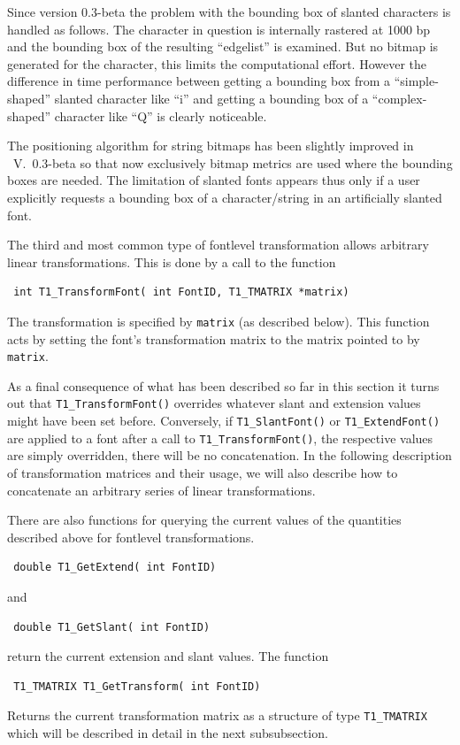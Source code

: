 Since version 0.3-beta the problem with the bounding box of slanted characters
is handled as follows. The character in question is internally rastered at
1000 bp and the bounding box of the resulting ``edgelist'' is examined. But no
bitmap is generated for the character, this limits the computational effort.
However the difference in time performance between getting a bounding box from
a ``simple-shaped'' slanted character like ``i'' and getting a bounding box of
a ``complex-shaped'' character like ``Q'' is clearly noticeable.

The positioning algorithm for string bitmaps has been slightly improved in
\tonelib\ V.\ 0.3-beta so that now exclusively bitmap metrics are used where 
the bounding boxes are needed. The limitation of slanted fonts appears thus
only if a user explicitly requests a bounding box of a character/string in an
artificially slanted font.

The third and most common type of fontlevel transformation allows arbitrary
linear transformations. This is done by a call to the function 
\precorr
\begin{verbatim}
 int T1_TransformFont( int FontID, T1_TMATRIX *matrix)
\end{verbatim}
\postcorr
The transformation is specified by \verb+matrix+ (as described below).
This function acts by setting the font's transformation matrix to the
matrix pointed to by \verb+matrix+.

As a final consequence of what has been described so far in this section it
turns out that \verb+T1_TransformFont()+ overrides whatever slant and extension
values might have been set before. Conversely, if \verb+T1_SlantFont()+ or
\verb+T1_ExtendFont()+ are applied to a font after a call to
\verb+T1_TransformFont()+, the respective values are simply overridden, there
will be no concatenation. In the following description of transformation
matrices and their usage, we will also describe how to concatenate an
arbitrary series of linear transformations.

There are also functions for querying the current values of the quantities
described above for fontlevel transformations.
\precorr
\begin{verbatim}
 double T1_GetExtend( int FontID)
\end{verbatim}\postcorr
and
\precorr
\begin{verbatim}
 double T1_GetSlant( int FontID)
\end{verbatim}\postcorr
return the current extension and slant values. The function 
\precorr
\begin{verbatim}
 T1_TMATRIX T1_GetTransform( int FontID)
\end{verbatim}\postcorr
Returns the current transformation matrix as a structure of type
\verb+T1_TMATRIX+ which will be described in detail in the next subsubsection. 

